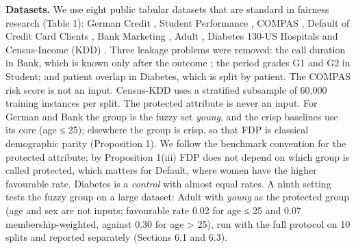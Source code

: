 \textbf{Datasets.} We use eight public tabular datasets that are standard in fairness research \cite{lequy} (Table 1): German Credit \cite{german}, Student Performance \cite{student}, COMPAS \cite{compas}, Default of Credit Card Clients \cite{default}, Bank Marketing \cite{bank}, Adult \cite{adult}, Diabetes 130-US Hospitals \cite{diabetes} and Census-Income (KDD) \cite{censuskdd}. Three leakage problems were removed: the call duration in Bank, which is known only after the outcome \cite{bank}; the period grades G1 and G2 in Student; and patient overlap in Diabetes, which is split by patient. The COMPAS risk score is not an input. Census-KDD uses a stratified subsample of 60,000 training instances per split. The protected attribute is never an input. For German and Bank the group is the fuzzy set \emph{young}, and the crisp baselines use its core (age ≤ 25); elsewhere the group is crisp, so that FDP is classical demographic parity (Proposition 1). We follow the benchmark convention \cite{lequy} for the protected attribute; by Proposition 1(iii) FDP does not depend on which group is called protected, which matters for Default, where women have the higher favourable rate. Diabetes is a \emph{control} with almost equal rates. A ninth setting tests the fuzzy group on a large dataset: Adult with \emph{young} as the protected group (age and sex are not inputs; favourable rate 0.02 for age ≤ 25 and 0.07 membership-weighted, against 0.30 for age \textgreater{} 25), run with the full protocol on 10 splits and reported separately (Sections 6.1 and 6.3).

